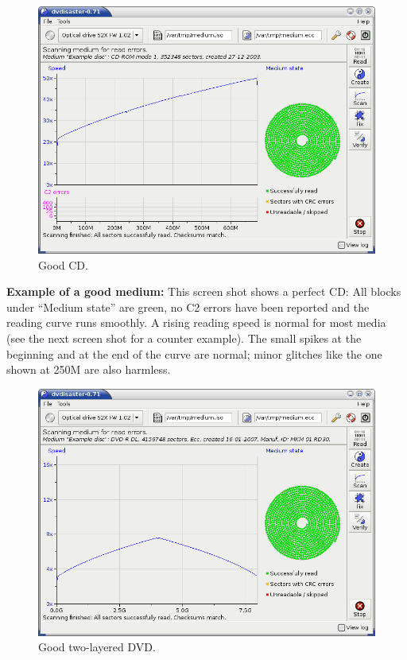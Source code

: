\newpage
\begin{figure}[h]
\centerline{\includegraphics[width=\textwidth]{screenshots/good-cd-scan.png}}
\caption{Good CD.}  
\label{howto-scan-good-cd}
\end{figure}

{\bf Example of a good medium:} This screen shot shows
a perfect CD: All blocks under ``Medium state'' are green, no C2
errors have been reported and the reading curve runs smoothly.
A rising reading speed is normal for most media (see the next screen
shot for a counter example). The small spikes at the beginning and
at the end of the curve are normal; minor glitches like the one shown
at 250M are also harmless.

\newpage
\begin{figure}[h]
\centerline{\includegraphics[width=\textwidth]{screenshots/good-dvd9-scan.png}}
\caption{Good two-layered DVD.}  
\label{howto-scan-good-two-layered-dvd}
\end{figure}

